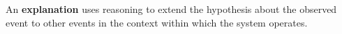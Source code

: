
\begin{defn}\label{def:explanation}
  \hypertarget{def:explanation}{} An \textbf{explanation} uses
  reasoning to extend the hypothesis about the observed event to other
  events in the context within which the system operates.
\end{defn}
                                         
